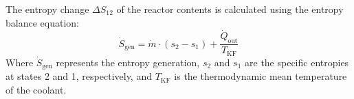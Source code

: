 The entropy change \( \Delta S_{12} \) of the reactor contents is calculated using the entropy balance equation:  
\[
\dot{S}_{\text{gen}} = \dot{m} \cdot (s_2 - s_1) + \frac{\dot{Q}_{\text{out}}}{T_{\text{KF}}}
\]  
Where \( \dot{S}_{\text{gen}} \) represents the entropy generation, \( s_2 \) and \( s_1 \) are the specific entropies at states 2 and 1, respectively, and \( T_{\text{KF}} \) is the thermodynamic mean temperature of the coolant.